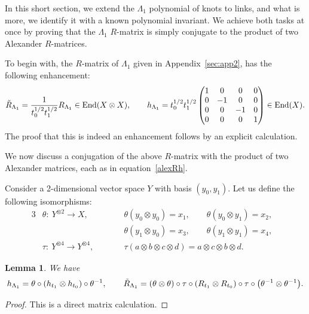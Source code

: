 \documentclass[10pt,a4paper]{amsart}
\numberwithin{equation}{section}
\newtheorem{Lemma}[Theorem]{Lemma}
\theoremstyle{definition}
\begin{document}
In this short section, we extend the $\Lambda_1$ polynomial of knots to links, and
what is more, we identify it with a known polynomial invariant.
We achieve both tasks at once by proving that the $\Lambda_1$ $R$-matrix is
simply conjugate to the product of two Alexander $R$-matrices.

To begin with, the $R$-matrix of $\Lambda_1$ given in Appendix~\ref{sec:app2},
has the following enhancement:
\begin{gather*}
\Tilde{R}_{\Lambda_1} = \frac{1}{t_0^{1/2} t_1^{1/2}} R_{\Lambda_1}
\in \mathrm{End}(X \otimes X),
\qquad h_{\Lambda_1} = t_0^{1/2} t_1^{1/2} \begin{pmatrix}
1 & 0 & 0 & 0 \\
0 & -1 & 0 & 0 \\
0 & 0 & -1 & 0 \\
0 & 0 & 0 & 1
\end{pmatrix} \in \mathrm{End}(X) .
\end{gather*}
The proof that this is indeed an enhancement follows by an explicit calculation.

We now discuss a conjugation of the above $R$-matrix with the product of two
Alexander matrices, each as in equation~\eqref{alexRh}.

Consider a 2-dimensional vector space $Y$ with basis $(y_0 , y_1)$. Let us define
the following isomorphisms:
\begin{alignat*}{3}
&\theta\colon \
 Y^{\otimes 2} \to X, \qquad&&
 \theta(y_0 \otimes y_0) = x_1,\qquad
 \theta(y_0 \otimes y_1) = x_2,& \\
 &&& \theta(y_1 \otimes y_0) = x_3,\qquad
 \theta(y_1 \otimes y_1) = x_4,&\\
&\tau\colon \
 Y^{\otimes 4} \to Y^{\otimes 4}, \qquad&&
 \tau(a \otimes b \otimes c \otimes d)= a \otimes c \otimes b \otimes d .&
\end{alignat*}

\begin{Lemma}\label{lem.RR}
We have
\begin{align*}
h_{\Lambda_1}  = \theta \circ (h_{t_1} \otimes h_{t_0}) \circ \theta^{-1},\qquad
\Tilde{R}_{\Lambda_1}   = (\theta \otimes \theta) \circ \tau
\circ (R_{t_1} \otimes R_{t_0}) \circ \tau \circ \bigl(\theta^{-1} \otimes \theta^{-1}\bigr) .
\end{align*}
\end{Lemma}

\begin{proof}
This is a direct matrix calculation.
\end{proof}
\end{document}
